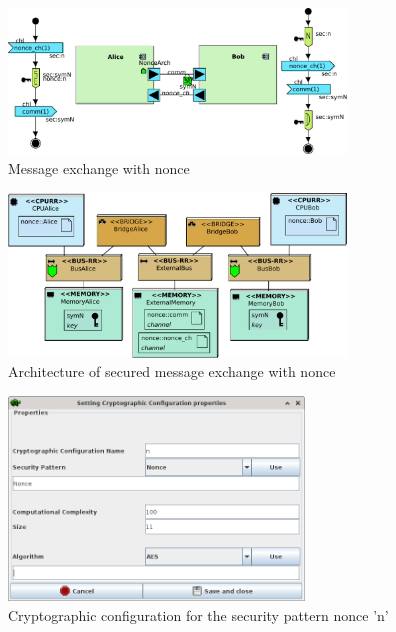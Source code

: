 \documentclass{llncs}
\begin{document}
\begin{figure}[htbp]
	\centering
	\includegraphics[width=0.8\textwidth]{figures/securityStuff/fv_alice_bob_nonce.pdf}
	\caption{Message exchange with nonce}
	\label{fig:nonce}
\end{figure}

\begin{figure}[htbp]
\includegraphics[width=0.8\textwidth]{figures/securityStuff/arch_alice_bob_nonce.pdf}
	\caption{Architecture of secured message exchange with nonce}
	\label{fig:nonceArch}
\end{figure}

\begin{figure}[htbp]
	\centering	\includegraphics[width=0.7\textwidth]{figures/securityStuff/encrypt-config-nonce-n.png}
	\caption{Cryptographic configuration for the security pattern nonce 'n'}
	\label{fig:nonceSecConfig-n}
\end{figure}
\end{document}
